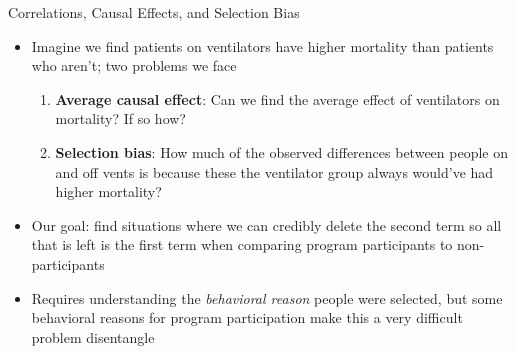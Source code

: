 \documentclass{beamer}
\begin{document}






\begin{frame}{Correlations, Causal Effects, and Selection Bias}



\begin{itemize}
\item Imagine we find patients on ventilators have higher mortality than patients who aren't; two problems we face 
	\begin{enumerate}
	\item \textbf{Average causal effect}: Can we find the average effect of ventilators on mortality? If so how?
	\item \textbf{Selection bias}: How much of the observed differences between people on and off vents is because these the ventilator group always would've had higher mortality?
	\end{enumerate}
\item Our goal: find situations where we can credibly delete the second term so all that is left is the first term when comparing program participants to non-participants

\item Requires understanding the \emph{behavioral reason} people were selected, but some behavioral reasons for program participation make this a very difficult problem disentangle

\end{itemize}

\end{frame}
\end{document}
